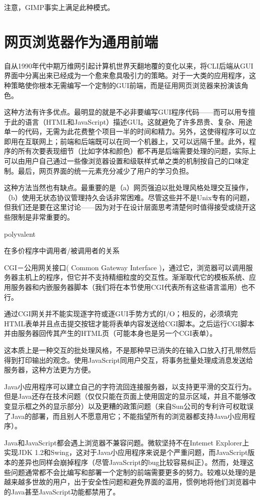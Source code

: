\documentclass[12pt,oneside]{book}
\begin{document}
\begin{common-format}
注意，GIMP事实上满足此种模式。

\section{网页浏览器作为通用前端}
自从1990年代中期万维网引起计算机世界天翻地覆的变化以来，将CLI后端从GUI界面中分离出来已经成为一个愈来愈具吸引力的策略。对于一大类的应用程序，这种策略使你根本无需编写一个定制的GUI前端，而是征用网页浏览器来扮演该角色。

这种方法有许多优点。最明显的就是不必非要编写GUI程序代码——而可以用专擅于此的语言（HTML和JavaScript）描述GUI。这就避免了许多昂贵、复杂、用途单一的代码，无需为此花费整个项目一半的时间和精力。另外，这使得程序可以立即用在互联网上；前端和后端既可以在同一个机器上，又可以远隔千里。此外，程序的所有次要表现细节（比如字体和颜色）都不再是后端需要处理的问题，实际上可以由用户自己通过一些像浏览器设置和级联样式单之类的机制按自己的口味定制。最后，网页界面的统一元素充分减少了用户的学习负担。

这种方法当然也有缺点。最重要的是（a）网页强迫以批处理风格处理交互操作，（b）使用无状态协议管理持久会话非常困难。尽管这些并不是Unix专有的问题，但我们还是要在这里讨论——因为对于在设计层面思考清楚何时值得接受或绕开这些限制是非常重要的。

\begin{fig}{polyvalent}
\caption{在多价程序中调用者/被调用者的关系}
\label{fig:polyvalent}
\end{fig}

CGI－公用网关接口( Common Gateway Interface )，通过它，浏览器可以调用服务器主机上的程序，但它并不支持精细粒度的交互性。渐渐取代它的模板系统、应用服务器和内嵌服务器脚本（我们将在本节使用CGI代表所有这些语言滥用）也不行。

通过CGI网关并不能实现逐字符或逐GUI手势方式的I/O；相反的，必须填完HTML表单并且点击提交按钮才能将表单内容发送给CGI脚本。之后运行CGI脚本并由服务器回传其产生的HTML页（可能本身也是另一个CGI表单）。

这本质上是一种交互的批处理风格，不是那种早已消失的在输入口放入打孔带然后得到打印输出的观念。使用JavaScript同用户交互，将事务批量处理成消息发送给服务器，这种方法更为方便。

Java小应用程序可以建立自己的字符流回连接服务器，以支持更平滑的交互行为。但是Java还存在技术问题（仅仅只能在页面上使用固定的显示区域，并且不能够改变显示框之外的显示部分）以及更糟的政策问题（来自Sun公司的专利许可权耽误了Java的部署，而且别人不愿意用它；不能指望所有的浏览器都支持Java小应用程序）。

Java和JavaScript都会遇上浏览器不兼容问题。微软坚持不在Intemet Explorer上实现JDK 1.2和Swing，这对于Java小应用程序来说是个严重问题，而JavaScript版本的差异也同样会崩掉程序（尽管JavaScript的bug比较容易纠正）。然而，处理这些问题通常都不会比编写和部署一个定制的前端需要更多的努力。较难以处理的是越来越多世故的用户，出于安全性问题和避免界面的滥用，惯例地将他们浏览器中的Java甚至JavaScript功能都禁用了。


\end{common-format}
\end{document}
